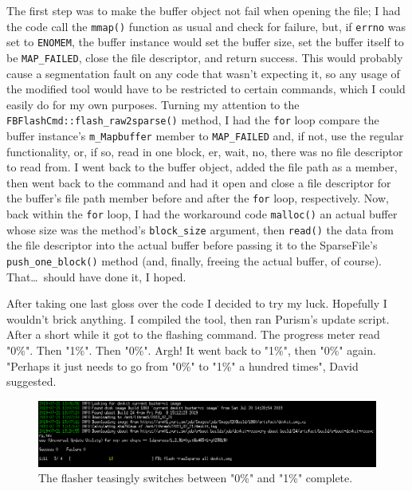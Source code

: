 \documentclass{article}
\begin{document}
The first step was to make the buffer object not fail when opening the file; I had the code call the \texttt{mmap()} function as usual and check for failure, but, if \texttt{errno} was set to \texttt{ENOMEM}, the buffer instance would set the buffer size, set the buffer itself to be \texttt{MAP_FAILED}, close the file descriptor, and return success.  This would probably cause a segmentation fault on any code that wasn't expecting it, so any usage of the modified tool would have to be restricted to certain commands, which I could easily do for my own purposes.  Turning my attention to the \texttt{FBFlashCmd::flash_raw2sparse()} method, I had the \texttt{for} loop compare the buffer instance's \texttt{m_Mapbuffer} member to \texttt{MAP_FAILED} and, if not, use the regular functionality, or, if so, read in one block, er, wait, no, there was no file descriptor to read from.  I went back to the buffer object, added the file path as a member, then went back to the command and had it open and close a file descriptor for the buffer's file path member before and after the \texttt{for} loop, respectively.  Now, back within the \texttt{for} loop, I had the workaround code \texttt{malloc()} an actual buffer whose size was the method's \texttt{block_size} argument, then \texttt{read()} the data from the file descriptor into the actual buffer before passing it to the SparseFile's \texttt{push_one_block()} method (and, finally, freeing the actual buffer, of course).  That\ldots~should have done it, I hoped.

After taking one last gloss over the code I decided to try my luck.  Hopefully I wouldn't brick anything.  I compiled the tool, then ran Purism's update script.  After a short while it got to the flashing command.  The progress meter read "0\%".  Then "1\%".  Then "0\%".  Argh!  It went back to "1\%", then "0\%" again.  "Perhaps it just needs to go from "0\%" to "1\%" a hundred times", David suggested.

\begin{figure}
\begin{center}
\includegraphics{files/blog/2019_08_04_flashing_the_librem5_from_a_32bit_machine/2019_08_04_flashing.png}
\caption{The flasher teasingly switches between "0\%" and "1\%" complete.}
\end{center}
\end{figure}
\end{document}
